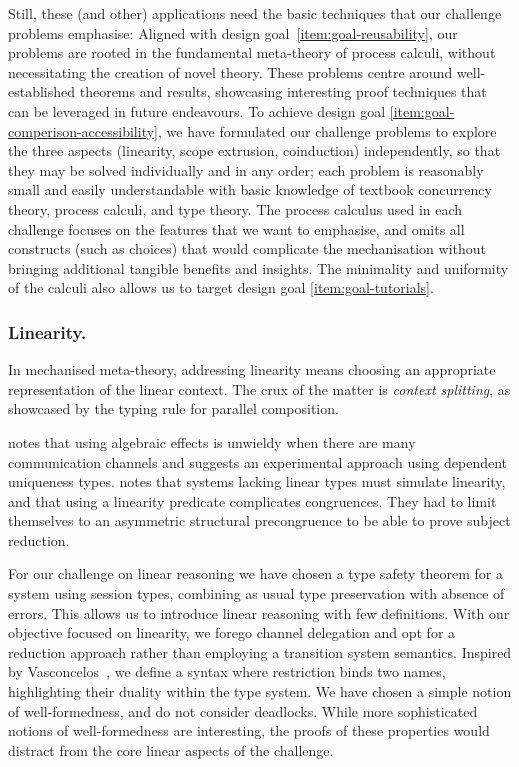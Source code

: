 \documentclass[runningheads]{llncs}
\begin{document}
Still, these (and other) applications need the basic
techniques that our challenge problems emphasise:
Aligned with design goal~\ref{item:goal-reusability}, our problems are rooted in the fundamental meta-theory of process calculi, without necessitating the creation of novel theory. These problems centre around well-established theorems and results, showcasing interesting proof techniques that can be leveraged in future endeavours.
To achieve design goal \ref{item:goal-comperison-accessibility}, we have
formulated our challenge problems to explore the three aspects
(linearity, scope extrusion, coinduction) independently, so that they
may be solved individually and in any order; each problem is
reasonably small and easily understandable with basic knowledge of
textbook concurrency theory, process calculi, and type theory.  The
process calculus used in each challenge focuses on the features that
we want to emphasise, and omits all constructs (such as choices) that
would complicate the mechanisation without bringing additional
tangible benefits and insights.  The minimality and uniformity of the
calculi also allows us to target design goal
\ref{item:goal-tutorials}.

\subsubsection{Linearity.}
In mechanised meta-theory, addressing linearity means choosing an appropriate representation of the linear context.
The crux of the matter is \emph{context splitting}, as showcased by the typing rule for parallel composition.

\cite{Brady2017} notes that using algebraic effects is unwieldy when there are many communication channels and suggests an experimental approach using dependent uniqueness types.
\cite{Zalakain2019} notes that systems lacking linear types must simulate linearity, and that using a linearity predicate complicates congruences.
They had to limit themselves to an asymmetric structural precongruence to be able to prove subject reduction.


For our challenge on linear reasoning we have chosen a type safety theorem
for a system using session types, combining as usual type preservation with absence of errors.
This allows us to introduce linear reasoning with few definitions.
With our objective focused on linearity, we forego channel delegation
and opt for a reduction approach rather than employing a transition
system semantics.  Inspired by Vasconcelos~\cite{Vasconcelos2012}, we
define a syntax where restriction binds two names, highlighting
their duality within the type system.  We have chosen a simple notion
of well-formedness, and do not  consider
deadlocks. While more sophisticated notions of well-formedness are
interesting, the proofs of these properties would distract from the
core linear aspects of the challenge.
\end{document}
